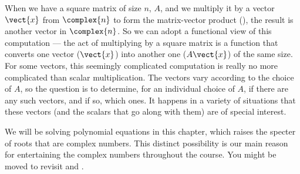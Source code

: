 \begin{para}When we have a square matrix of size $n$, $A$, and we multiply it by a vector $\vect{x}$ from $\complex{n}$ to form the matrix-vector product (), the result is another vector in $\complex{n}$.  So we can adopt a functional view of this computation --- the act of multiplying by a square matrix is a function that converts one vector ($\vect{x}$) into another one ($A\vect{x}$) of the same size.  For some vectors, this seemingly complicated computation is really no more complicated than scalar multiplication.  The vectors vary according to the choice of $A$, so the question is to determine, for an individual choice of $A$, if there are any such vectors, and if so, which ones.  It happens in a variety of situations that these vectors (and the scalars that go along with them) are of special interest.\end{para}
%
\begin{para}We will be solving polynomial equations in this chapter, which raises the specter of roots that are complex numbers.  This distinct possibility is our main reason for entertaining the complex numbers throughout the course.  You might be moved to revisit  and .\end{para}
